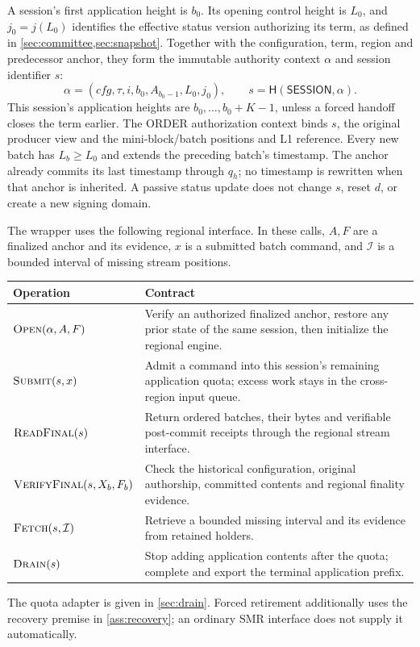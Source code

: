\documentclass[11pt,a4paper,onecolumn]{article}
\newcommand{\Hash}{\mathsf H}
\newcommand{\Tag}[1]{\ensuremath{\mathsf{#1}}}
\newcommand{\Proc}[1]{\textnormal{\textsc{#1}}}
\begin{document}
A session's first application height is $b_0$. Its opening control height
is $L_0$, and $j_0=j(L_0)$ identifies the effective status version
authorizing its term, as defined in \cref{sec:committee,sec:snapshot}.
Together with the configuration, term, region and predecessor anchor,
they form the immutable authority context $\alpha$ and session identifier $s$:
\[
 \alpha=(\mathit{cfg},\tau,i,b_0,A_{b_0-1},L_0,j_0),
 \qquad s=\Hash(\Tag{SESSION},\alpha).
\]
This session's application heights are
$b_0,\ldots,b_0+K-1$, unless a forced handoff closes the term earlier.
The ORDER authorization context binds $s$, the original producer view and
the mini-block/batch positions and L1 reference. Every new batch has
$L_b\geq L_0$ and extends the preceding batch's timestamp. The anchor
already commits its last timestamp through $q_h$; no timestamp is rewritten
when that anchor is inherited. A passive status update does not change
$s$, reset $d$, or create a new signing domain.

The wrapper uses the following regional interface. In these calls,
$A,F$ are a finalized anchor and its evidence, $x$ is a submitted batch
command, and $\mathcal I$ is a bounded interval of missing stream positions.
\begin{center}\small
\begin{tabularx}{\linewidth}{@{}p{.29\linewidth}Y@{}}\toprule
Operation & Contract\\\midrule
$\Proc{Open}(\alpha,A,F)$ & Verify an authorized finalized anchor, restore
any prior state of the same session, then initialize the regional engine.\\
$\Proc{Submit}(s,x)$ & Admit a command into this session's remaining
application quota; excess work stays in the cross-region input queue.\\
$\Proc{ReadFinal}(s)$ & Return ordered batches, their bytes and verifiable
post-commit receipts through the regional stream interface.\\
$\Proc{VerifyFinal}(s,X_b,F_b)$ & Check the historical configuration,
original authorship, committed contents and regional finality evidence.\\
$\Proc{Fetch}(s,\mathcal I)$ & Retrieve a bounded missing interval and
its evidence from retained holders.\\
$\Proc{Drain}(s)$ & Stop adding application contents after the quota;
complete and export the terminal application prefix.\\\bottomrule
\end{tabularx}
\end{center}
The quota adapter is given in \cref{sec:drain}. Forced retirement additionally
uses the recovery premise in \cref{ass:recovery}; an ordinary SMR interface
does not supply it automatically.
\end{document}
